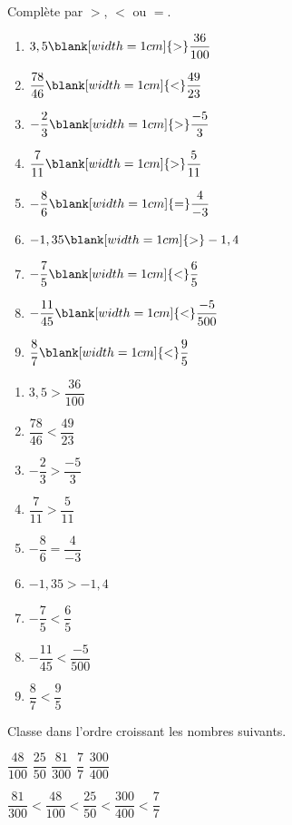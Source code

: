 \begin{exercise}
  Complète par $>$, $<$ ou $=$.
  \begin{enumerate}[cols=3]
    \item $3,5\blank[width=1cm]{>}\dfrac{36}{100}$
    \item $\dfrac{78}{46}\blank[width=1cm]{<}\dfrac{49}{23}$
    \item $-\dfrac{2}{3}\blank[width=1cm]{>}\dfrac{-5}{3}$
    \item $\dfrac{7}{11}\blank[width=1cm]{>}\dfrac{5}{11}$
    \item $-\dfrac{8}{6}\blank[width=1cm]{=}\dfrac{4}{-3}$
    \item $-1,35\blank[width=1cm]{>}-1,4$
    \item $-\dfrac{7}{5}\blank[width=1cm]{<}\dfrac{6}{5}$
    \item $-\dfrac{11}{45}\blank[width=1cm]{<}\dfrac{-5}{500}$
    \item $\dfrac{8}{7}\blank[width=1cm]{<}\dfrac{9}{5}$
  \end{enumerate}
\end{exercise}
\begin{solution}
  \begin{enumerate}[cols=3]
    \item $3,5>\dfrac{36}{100}$
    \item $\dfrac{78}{46}<\dfrac{49}{23}$
    \item $-\dfrac{2}{3}>\dfrac{-5}{3}$
    \item $\dfrac{7}{11}>\dfrac{5}{11}$
    \item $-\dfrac{8}{6}=\dfrac{4}{-3}$
    \item $-1,35>-1,4$
    \item $-\dfrac{7}{5}<\dfrac{6}{5}$
    \item $-\dfrac{11}{45}<\dfrac{-5}{500}$
    \item $\dfrac{8}{7}<\dfrac{9}{5}$
  \end{enumerate}
\end{solution}
\newpage

\begin{exercise}
  Classe dans l'ordre croissant les nombres suivants.
  \begin{center}
    $\dfrac{48}{100}$\hfil
    $\dfrac{25}{50}$\hfil
    $\dfrac{81}{300}$\hfil
    $\dfrac{7}{7}$\hfil
    $\dfrac{300}{400}$
  \end{center}
\end{exercise}
\begin{solution}
  \begin{center}
    $\dfrac{81}{300}<
    \dfrac{48}{100}<
    \dfrac{25}{50}<
    \dfrac{300}{400}<
    \dfrac{7}{7}$
  \end{center}
\end{solution}

